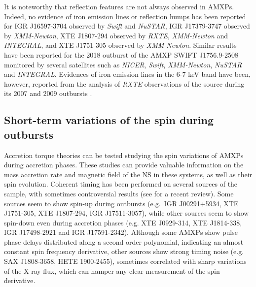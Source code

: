 \documentclass[graybox]{svmult}
\def \inte {{\em INTEGRAL\xspace}}
\def \swift {{\em Swift\xspace}}
\def \xmm {{\em XMM-Newton\xspace}}
\def \rxte {{\em RXTE\xspace}}
\def \nustar{{\em NuSTAR\xspace}}
\def \nicer{{\em NICER\xspace}}
\begin{document}
It is noteworthy that reflection features are not always observed in AMXPs. Indeed, no evidence of iron emission lines or reflection humps has been reported for IGR J16597-3704 \cite{Sanna2018a} observed by \swift{} and \nustar{}, IGR J17379-3747 \cite{Sanna2018b} observed by \xmm{}, XTE J1807-294 \cite{Falanga2005a} observed by \rxte{}, \xmm{} and \inte{}, and XTE J1751-305 \cite{Miller2003} observed by \xmm{}. Similar results have been reported for the 2018 outburst of the AMXP SWIFT J1756.9-2508 monitored by several satellites such as \nicer{}, \swift{}, \xmm{}, \nustar{} and \inte{}.  Evidences of iron emission lines in the 6-7 keV band have been, however, reported from the analysis of \rxte{} observations of the source during its 2007 and 2009 outbursts \cite{Patruno2010c}.

\subsection{Short-term variations of the spin during outbursts}

Accretion torque theories can be tested studying the spin variations of AMXPs during accretion phases. These studies can provide valuable information on the mass accretion rate and magnetic field of the NS in these systems, as well as their spin evolution. Coherent timing has been performed on several sources of the sample, with sometimes controversial results (see \cite{Campana2018} for a recent review). Some sources seem to show spin-up during outbursts (e.g.\ IGR J00291+5934, XTE J1751-305, XTE J1807-294, IGR J17511-3057), while other sources seem to show spin-down even during accretion phases (e.g. XTE J0929-314,  XTE J1814-338, IGR J17498-2921 and IGR J17591-2342). Although some AMXPs show pulse phase delays distributed along a second order polynomial, indicating an almost constant spin frequency derivative, other sources show strong timing noise (e.g. SAX J1808-3658, HETE 1900-2455), sometimes correlated with sharp variations of the X-ray flux, which can hamper any clear measurement of the spin derivative.
\end{document}
